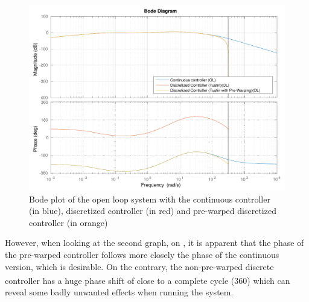 \begin{figure}[H]
  \centering
  \includegraphics[scale=.6]{figures/prewarpVsNoPrewarpVsContinuousBodeOpenLoop.pdf}
  \caption{Bode plot of the open loop system with the continuous controller\\(in blue), discretized controller (in red) and pre-warped discretized controller (in orange)}
  \label{fig:bodePrewarpVsNoPrewarpVsContinuousOpenLoop}
\end{figure}
%
However, when looking at the second graph, on , it is apparent that the phase of the pre-warped controller follows more closely the phase of the continuous version, which is desirable. On the contrary, the non-pre-warped discrete controller has a huge phase shift of close to a complete cycle (\si{360^{\circ}}) which can reveal some badly unwanted effects when running the system.

